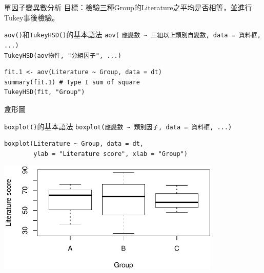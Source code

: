 \documentclass[12pt, aspectratio=43]{beamer}
\begin{document}

\begin{frame}[fragile]{單因子變異數分析}
目標：檢驗三種Group的Literature之平均是否相等，並進行Tukey事後檢驗。

\begin{block}{\texttt{aov()}和\texttt{TukeyHSD()}的基本語法}
\verb+aov(+
\verb+應變數 ~ 三組以上類別自變數, data = 資料框, ...)+\\
\verb+TukeyHSD(aov物件, "分組因子", ...)+
\end{block}

\begin{verbatim}
fit.1 <- aov(Literature ~ Group, data = dt)
summary(fit.1) # Type I sum of square
TukeyHSD(fit, "Group")
\end{verbatim}

\end{frame}

\begin{frame}[fragile]{盒形圖}

\begin{block}{\texttt{boxplot()}的基本語法}
\verb+boxplot(應變數 ~ 類別因子, data = 資料框, ...)+
\end{block}

\begin{verbatim}
boxplot(Literature ~ Group, data = dt, 
        ylab = "Literature score", xlab = "Group")
\end{verbatim}

\begin{center}
\includegraphics[width=0.8\textwidth]{Rplot-three-group.pdf}
\end{center}
\end{frame}

%
\end{document}
